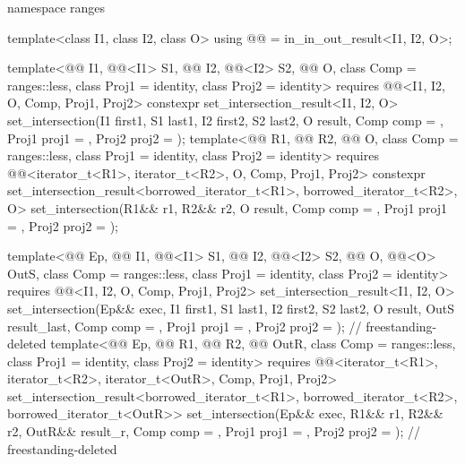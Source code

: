 \begin{codeblock}
{  namespace ranges {
    template<class I1, class I2, class O>
      using @@ = in_in_out_result<I1, I2, O>;

    template<@@ I1, @@<I1> S1, @@ I2, @@<I2> S2,
             @@ O, class Comp = ranges::less,
             class Proj1 = identity, class Proj2 = identity>
      requires @@<I1, I2, O, Comp, Proj1, Proj2>
      constexpr set_intersection_result<I1, I2, O>
        set_intersection(I1 first1, S1 last1, I2 first2, S2 last2, O result,
                         Comp comp = {}, Proj1 proj1 = {}, Proj2 proj2 = {});
    template<@@ R1, @@ R2, @@ O,
             class Comp = ranges::less, class Proj1 = identity, class Proj2 = identity>
      requires @@<iterator_t<R1>, iterator_t<R2>, O, Comp, Proj1, Proj2>
      constexpr set_intersection_result<borrowed_iterator_t<R1>, borrowed_iterator_t<R2>, O>
        set_intersection(R1&& r1, R2&& r2, O result,
                         Comp comp = {}, Proj1 proj1 = {}, Proj2 proj2 = {});

    template<@@ Ep, @@ I1, @@<I1> S1,
             @@ I2, @@<I2> S2,
             @@ O, @@<O> OutS, class Comp = ranges::less,
             class Proj1 = identity, class Proj2 = identity>
      requires @@<I1, I2, O, Comp, Proj1, Proj2>
      set_intersection_result<I1, I2, O>
        set_intersection(Ep&& exec, I1 first1, S1 last1, I2 first2, S2 last2,
                         O result, OutS result_last, Comp comp = {}, Proj1 proj1 = {},
                         Proj2 proj2 = {});                     // freestanding-deleted
    template<@@ Ep, @@ R1, @@ R2,
             @@ OutR, class Comp = ranges::less,
             class Proj1 = identity, class Proj2 = identity>
      requires @@<iterator_t<R1>, iterator_t<R2>, iterator_t<OutR>, Comp, Proj1, Proj2>
      set_intersection_result<borrowed_iterator_t<R1>, borrowed_iterator_t<R2>,
                              borrowed_iterator_t<OutR>>
        set_intersection(Ep&& exec, R1&& r1, R2&& r2, OutR&& result_r, Comp comp = {},
                         Proj1 proj1 = {}, Proj2 proj2 = {});   // freestanding-deleted
  }

}
\end{codeblock}
